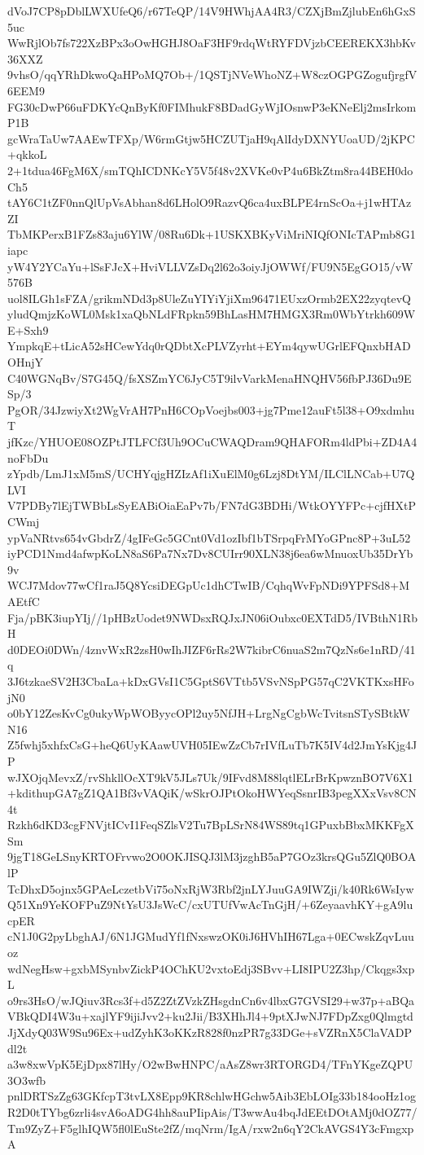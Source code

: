 dVoJ7CP8pDblLWXUfeQ6/r67TeQP/14V9HWhjAA4R3/CZXjBmZjlubEn6hGxS5uc
WwRjlOb7fs722XzBPx3oOwHGHJ8OaF3HF9rdqWtRYFDVjzbCEEREKX3hbKv36XXZ
9vhsO/qqYRhDkwoQaHPoMQ7Ob+/1QSTjNVeWhoNZ+W8czOGPGZogufjrgfV6EEM9
FG30cDwP66uFDKYcQnByKf0FIMhukF8BDadGyWjIOsnwP3eKNeElj2msIrkomP1B
gcWraTaUw7AAEwTFXp/W6rmGtjw5HCZUTjaH9qAlIdyDXNYUoaUD/2jKPC+qkkoL
2+1tdua46FgM6X/smTQhICDNKcY5V5f48v2XVKe0vP4u6BkZtm8ra44BEH0doCh5
tAY6C1tZF0nnQlUpVsAbhan8d6LHolO9RazvQ6ca4uxBLPE4rnScOa+j1wHTAzZI
TbMKPerxB1FZs83aju6YlW/08Ru6Dk+1USKXBKyViMriNIQfONIcTAPmb8G1iapc
yW4Y2YCaYu+lSsFJcX+HviVLLVZsDq2l62o3oiyJjOWWf/FU9N5EgGO15/vW576B
uol8ILGh1sFZA/grikmNDd3p8UleZuYIYiYjiXm96471EUxzOrmb2EX22zyqtevQ
yludQmjzKoWL0Msk1xaQbNLdFRpkn59BhLasHM7HMGX3Rm0WbYtrkh609WE+Sxh9
YmpkqE+tLicA52sHCewYdq0rQDbtXcPLVZyrht+EYm4qywUGrlEFQnxbHADOHnjY
C40WGNqBv/S7G45Q/fsXSZmYC6JyC5T9ilvVarkMenaHNQHV56fbPJ36Du9ESp/3
PgOR/34JzwiyXt2WgVrAH7PnH6COpVoejbs003+jg7Pme12auFt5l38+O9xdmhuT
jfKzc/YHUOE08OZPtJTLFCf3Uh9OCuCWAQDram9QHAFORm4ldPbi+ZD4A4noFbDu
zYpdb/LmJ1xM5mS/UCHYqjgHZIzAf1iXuElM0g6Lzj8DtYM/ILClLNCab+U7QLVI
V7PDBy7lEjTWBbLsSyEABiOiaEaPv7b/FN7dG3BDHi/WtkOYYFPc+cjfHXtPCWmj
ypVaNRtvs654vGbdrZ/4gIFeGc5GCnt0Vd1ozIbf1bTSrpqFrMYoGPnc8P+3uL52
iyPCD1Nmd4afwpKoLN8aS6Pa7Nx7Dv8CUIrr90XLN38j6ea6wMnuoxUb35DrYb9v
WCJ7Mdov77wCf1raJ5Q8YcsiDEGpUc1dhCTwIB/CqhqWvFpNDi9YPFSd8+MAEtfC
Fja/pBK3iupYIj//1pHBzUodet9NWDsxRQJxJN06iOubxc0EXTdD5/IVBthN1RbH
d0DEOi0DWn/4znvWxR2zsH0wIhJIZF6rRs2W7kibrC6nuaS2m7QzNs6e1nRD/41q
3J6tzkaeSV2H3CbaLa+kDxGVsI1C5GptS6VTtb5VSvNSpPG57qC2VKTKxsHFojN0
o0bY12ZesKvCg0ukyWpWOByycOPl2uy5NfJH+LrgNgCgbWcTvitsnSTySBtkWN16
Z5fwhj5xhfxCsG+heQ6UyKAawUVH05IEwZzCb7rIVfLuTb7K5IV4d2JmYsKjg4JP
wJXOjqMevxZ/rvShkllOcXT9kV5JLs7Uk/9IFvd8M88lqtlELrBrKpwznBO7V6X1
+kdithupGA7gZ1QA1Bf3vVAQiK/wSkrOJPtOkoHWYeqSsnrIB3pegXXxVsv8CN4t
Rzkh6dKD3cgFNVjtICvI1FeqSZlsV2Tu7BpLSrN84WS89tq1GPuxbBbxMKKFgXSm
9jgT18GeLSnyKRTOFrvwo2O0OKJISQJ3lM3jzghB5aP7GOz3krsQGu5ZlQ0BOAlP
TcDhxD5ojnx5GPAeLczetbVi75oNxRjW3Rbf2jnLYJuuGA9IWZji/k40Rk6WsIyw
Q51Xn9YeKOFPuZ9NtYsU3JsWcC/cxUTUfVwAcTnGjH/+6ZeyaavhKY+gA9lucpER
cN1J0G2pyLbghAJ/6N1JGMudYf1fNxswzOK0iJ6HVhIH67Lga+0ECwskZqvLuuoz
wdNegHsw+gxbMSynbvZickP4OChKU2vxtoEdj3SBvv+LI8IPU2Z3hp/Ckqgs3xpL
o9rs3HsO/wJQiuv3Rcs3f+d5Z2ZtZVzkZHsgdnCn6v4lbxG7GVSI29+w37p+aBQa
VBkQDI4W3u+xajlYF9ijiJvv2+ku2Jii/B3XHhJl4+9ptXJwNJ7FDpZxg0Qlmgtd
JjXdyQ03W9Su96Ex+udZyhK3oKKzR828f0nzPR7g33DGe+sVZRnX5ClaVADPdl2t
a3w8xwVpK5EjDpx87lHy/O2wBwHNPC/aAsZ8wr3RTORGD4/TFnYKgeZQPU3O3wfb
pnlDRTSzZg63GKfcpT3tvLX8Epp9KR8chlwHGchw5Aib3EbLOIg33b184ooHz1og
R2D0tTYbg6zrli4svA6oADG4hh8auPIipAis/T3wwAu4bqJdEEtDOtAMj0dOZ77/
Tm9ZyZ+F5glhIQW5fl0lEuSte2fZ/mqNrm/IgA/rxw2n6qY2CkAVGS4Y3cFmgxpA
